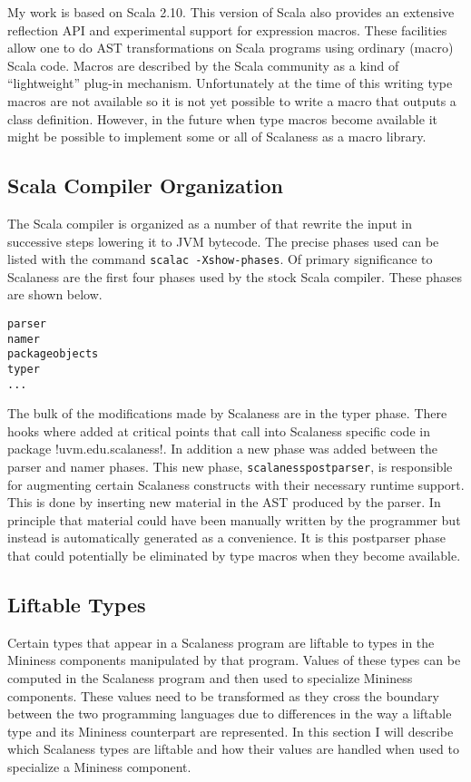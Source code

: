 My work is based on Scala 2.10. This version of Scala also provides an extensive reflection API
and experimental support for expression macros. These facilities allow one to do AST
transformations on Scala programs using ordinary (macro) Scala code. Macros are described by the
Scala community as a kind of ``lightweight'' plug-in mechanism. Unfortunately at the time of this
writing type macros are not available so it is not yet possible to write a macro that outputs a
class definition. However, in the future when type macros become available it might be possible
to implement some or all of Scalaness as a macro library.

\subsection{Scala Compiler Organization}
\label{section-scala-compiler-organization}

The Scala compiler is organized as a number of  that rewrite the input in
successive steps lowering it to JVM bytecode. The precise phases used can be listed with the
command \texttt{scalac -Xshow-phases}. Of primary significance to Scalaness are the first four
phases used by the stock Scala compiler. These phases are shown below.

\singlespace
\begin{Verbatim}
parser
namer
packageobjects
typer
...
\end{Verbatim}
\primaryspacing

The bulk of the modifications made by Scalaness are in the typer phase. There hooks where added
at critical points that call into Scalaness specific code in package !uvm.edu.scalaness!. In
addition a new phase was added between the parser and namer phases. This new phase,
\texttt{scalanesspostparser}, is responsible for augmenting certain Scalaness constructs with
their necessary runtime support. This is done by inserting new material in the AST produced by
the parser. In principle that material could have been manually written by the programmer but
instead is automatically generated as a convenience. It is this postparser phase that could
potentially be eliminated by type macros when they become available.

\subsection{Liftable Types}
\label{section-liftable-types}

Certain types that appear in a Scalaness program are liftable to types in the Mininess
components manipulated by that program. Values of these types can be computed in the Scalaness
program and then used to specialize Mininess components. These values need to be transformed as
they cross the boundary between the two programming languages due to differences in the way a
liftable type and its Mininess counterpart are represented. In this section I will describe
which Scalaness types are liftable and how their values are handled when used to specialize a
Mininess component.

